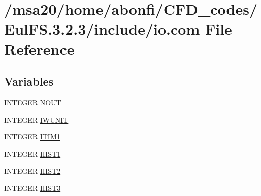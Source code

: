 \hypertarget{msa20_2home_2abonfi_2_c_f_d__codes_2_eul_f_s_83_82_83_2include_2io_8com}{\section{/msa20/home/abonfi/\-C\-F\-D\-\_\-codes/\-Eul\-F\-S.3.2.3/include/io.com File Reference}
\label{msa20_2home_2abonfi_2_c_f_d__codes_2_eul_f_s_83_82_83_2include_2io_8com}
}
\subsection*{Variables}
\begin{DoxyCompactItemize}
\item 
I\-N\-T\-E\-G\-E\-R \hyperlink{msa20_2home_2abonfi_2_c_f_d__codes_2_eul_f_s_83_82_83_2include_2io_8com_aeba7952d454c55ab9bc084b8c6f57e33}{N\-O\-U\-T}
\item 
I\-N\-T\-E\-G\-E\-R \hyperlink{msa20_2home_2abonfi_2_c_f_d__codes_2_eul_f_s_83_82_83_2include_2io_8com_aa9185ed656abac771c2c35c8cc03d905}{I\-W\-U\-N\-I\-T}
\item 
I\-N\-T\-E\-G\-E\-R \hyperlink{msa20_2home_2abonfi_2_c_f_d__codes_2_eul_f_s_83_82_83_2include_2io_8com_a6f18619936ee945afce62c678dfde10f}{I\-T\-I\-M1}
\item 
I\-N\-T\-E\-G\-E\-R \hyperlink{msa20_2home_2abonfi_2_c_f_d__codes_2_eul_f_s_83_82_83_2include_2io_8com_aad736aba81e9536b88069c08ca8e4f19}{I\-H\-S\-T1}
\item 
I\-N\-T\-E\-G\-E\-R \hyperlink{msa20_2home_2abonfi_2_c_f_d__codes_2_eul_f_s_83_82_83_2include_2io_8com_ab952683be255e3f14b5e99749855df18}{I\-H\-S\-T2}
\item 
I\-N\-T\-E\-G\-E\-R \hyperlink{msa20_2home_2abonfi_2_c_f_d__codes_2_eul_f_s_83_82_83_2include_2io_8com_a2a9a7a7858f9c5e518984424d8e76db7}{I\-H\-S\-T3}
\end{DoxyCompactItemize}


